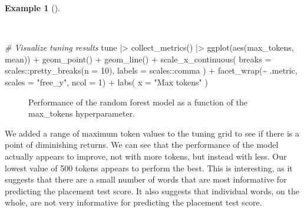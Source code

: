 \documentclass[
  letterpaper,
  DIV=11,
  numbers=noendperiod]{scrreprt}
\newenvironment{Shaded}{\begin{snugshade}}{\end{snugshade}}
\newcommand{\AttributeTok}[1]{\textcolor[rgb]{0.00,0.00,0.00}{#1}}
\newcommand{\CommentTok}[1]{\textcolor[rgb]{0.00,0.00,0.00}{\textit{#1}}}
\newcommand{\DecValTok}[1]{\textcolor[rgb]{0.00,0.00,0.00}{#1}}
\newcommand{\FunctionTok}[1]{\textcolor[rgb]{0.00,0.00,0.00}{#1}}
\newcommand{\NormalTok}[1]{\textcolor[rgb]{0.00,0.00,0.00}{#1}}
\newcommand{\SpecialCharTok}[1]{\textcolor[rgb]{0.00,0.00,0.00}{#1}}
\newcommand{\StringTok}[1]{\textcolor[rgb]{0.00,0.00,0.00}{#1}}
\theoremstyle{definition}
\newtheorem{example}{Example}[chapter]
\theoremstyle{remark}
\begin{document}
\begin{example}[]\protect\hypertarget{exm-pda-reg-model-spec-random-forest-workflow-tune-plot}{}\label{exm-pda-reg-model-spec-random-forest-workflow-tune-plot}

~

\begin{Shaded}
\begin{Highlighting}[]
\CommentTok{\# Visualize tuning results}
\NormalTok{tune }\SpecialCharTok{|\textgreater{}}
  \FunctionTok{collect\_metrics}\NormalTok{() }\SpecialCharTok{|\textgreater{}}
  \FunctionTok{ggplot}\NormalTok{(}\FunctionTok{aes}\NormalTok{(max\_tokens, mean)) }\SpecialCharTok{+}
  \FunctionTok{geom\_point}\NormalTok{() }\SpecialCharTok{+}
  \FunctionTok{geom\_line}\NormalTok{() }\SpecialCharTok{+}
  \FunctionTok{scale\_x\_continuous}\NormalTok{(}
    \AttributeTok{breaks =}\NormalTok{ scales}\SpecialCharTok{::}\FunctionTok{pretty\_breaks}\NormalTok{(}\AttributeTok{n =} \DecValTok{10}\NormalTok{),}
    \AttributeTok{labels =}\NormalTok{ scales}\SpecialCharTok{::}\NormalTok{comma}
\NormalTok{  ) }\SpecialCharTok{+}
  \FunctionTok{facet\_wrap}\NormalTok{(}\SpecialCharTok{\textasciitilde{}}\NormalTok{ .metric, }\AttributeTok{scales =} \StringTok{"free\_y"}\NormalTok{, }\AttributeTok{ncol =} \DecValTok{1}\NormalTok{) }\SpecialCharTok{+}
  \FunctionTok{labs}\NormalTok{(}
    \AttributeTok{x =} \StringTok{"Max tokens"}
\NormalTok{  )}
\end{Highlighting}
\end{Shaded}

\begin{figure}[H]


\caption{\label{fig-pda-reg-model-spec-random-forest-workflow-tune-plot}Performance
of the random forest model as a function of the max\_tokens
hyperparameter.}

\end{figure}%

\end{example}

We added a range of maximum token values to the tuning grid to see if
there is a point of diminishing returns. We can see that the performance
of the model actually appears to improve, not with more tokens, but
instead with less. Our lowest value of 500 tokens appears to perform the
best. This is interesting, as it suggests that there are a small number
of words that are most informative for predicting the placement test
score. It also suggests that individual words, on the whole, are not
very informative for predicting the placement test score.
\end{document}
